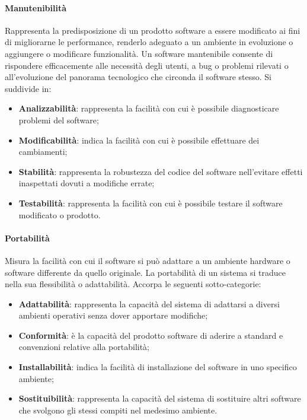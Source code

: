 \documentclass[10pt]{article}
\begin{document}
\begin{justify}
            \paragraph{Manutenibilità}
            Rappresenta la predisposizione di un prodotto software a essere modificato ai fini di migliorarne le performance, renderlo adeguato a un ambiente in evoluzione
            o aggiungere o modificare funzionalità. Un software mantenibile consente di rispondere efficacemente alle necessità degli utenti, a bug o problemi rilevati o
            all'evoluzione del panorama tecnologico che circonda il software stesso. Si suddivide in:
            \begin{itemize}
                \item \textbf{Analizzabilità}: rappresenta la facilità con cui è possibile diagnosticare problemi del software;
                \item \textbf{Modificabilità}: indica la facilità con cui è possibile effettuare dei cambiamenti;
                \item \textbf{Stabilità}: rappresenta la robustezza del codice del software nell'evitare effetti inaspettati dovuti a modifiche errate;
                \item \textbf{Testabilità}: rappresenta la facilità con cui è possibile testare il software modificato o prodotto.
            \end{itemize}

            \paragraph{Portabilità}
            Misura la facilità con cui il software si può adattare a un ambiente hardware o software differente da quello originale. La portabilità di un sistema si
            traduce nella sua flessibilità o adattabilità. Accorpa le seguenti sotto-categorie:
            \begin{itemize}
                \item \textbf{Adattabilità}: rappresenta la capacità del sistema di adattarsi a diversi ambienti operativi senza dover apportare modifiche;
                \item \textbf{Conformità}: è la capacità del prodotto software di aderire a standard e convenzioni relative alla portabilità;
                \item \textbf{Installabilità}: indica la facilità di installazione del software in uno specifico ambiente;
                \item \textbf{Sostituibilità}: rappresenta la capacità del sistema di sostituire altri software che svolgono gli stessi compiti nel medesimo ambiente.
            \end{itemize}


\end{justify}
\end{document}
